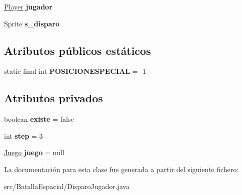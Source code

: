 \begin{DoxyCompactItemize}
\item 
\hypertarget{classBatallaEspacial_1_1DisparoJugador_a252a6e9906aed6fd89d3f4e06e409bd8}{
\hyperlink{classBatallaEspacial_1_1Player}{Player} {\bfseries jugador}}
\label{classBatallaEspacial_1_1DisparoJugador_a252a6e9906aed6fd89d3f4e06e409bd8}

\item 
\hypertarget{classBatallaEspacial_1_1DisparoJugador_a53a596f3517f05acda954448e710f6de}{
Sprite {\bfseries s\_\-disparo}}
\label{classBatallaEspacial_1_1DisparoJugador_a53a596f3517f05acda954448e710f6de}

\end{DoxyCompactItemize}
\subsection*{Atributos públicos estáticos}
\begin{DoxyCompactItemize}
\item 
\hypertarget{classBatallaEspacial_1_1DisparoJugador_acb151cf2b3133d432fe44a9d73914f0f}{
static final int {\bfseries POSICIONESPECIAL} = -\/1}
\label{classBatallaEspacial_1_1DisparoJugador_acb151cf2b3133d432fe44a9d73914f0f}

\end{DoxyCompactItemize}
\subsection*{Atributos privados}
\begin{DoxyCompactItemize}
\item 
\hypertarget{classBatallaEspacial_1_1DisparoJugador_a3edc8dc224d3cb2a47dedb37540acdc8}{
boolean {\bfseries existe} = false}
\label{classBatallaEspacial_1_1DisparoJugador_a3edc8dc224d3cb2a47dedb37540acdc8}

\item 
\hypertarget{classBatallaEspacial_1_1DisparoJugador_a113b2564f259acc42d47e13819623c09}{
int {\bfseries step} = 3}
\label{classBatallaEspacial_1_1DisparoJugador_a113b2564f259acc42d47e13819623c09}

\item 
\hypertarget{classBatallaEspacial_1_1DisparoJugador_afff63e81b4bbf1a045b288913f8797f4}{
\hyperlink{classBatallaEspacial_1_1Juego}{Juego} {\bfseries juego} = null}
\label{classBatallaEspacial_1_1DisparoJugador_afff63e81b4bbf1a045b288913f8797f4}

\end{DoxyCompactItemize}


La documentación para esta clase fue generada a partir del siguiente fichero:\begin{DoxyCompactItemize}
\item 
src/BatallaEspacial/DisparoJugador.java\end{DoxyCompactItemize}
